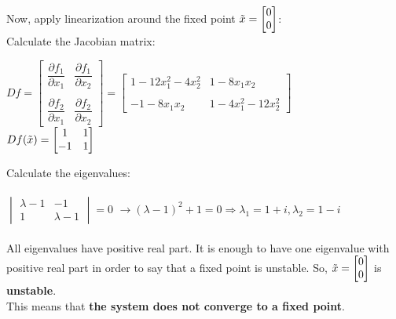 \documentclass[12pt,a4paper, margin=1in]{article}
\begin{document}
\begin{enumerate}
        Now, apply linearization around the fixed point $\Tilde{x} = \begin{bmatrix} 0 \\ 0\end{bmatrix}$: \\
        Calculate the Jacobian matrix:
        \begin{center}
            $Df = \begin{bmatrix}
                    \dfrac{\partial f_1}{\partial x_1} & \dfrac{\partial f_1}{\partial x_2} \\ \\
                    \dfrac{\partial f_2}{\partial x_1} & \dfrac{\partial f_2}{\partial x_2}
                \end{bmatrix} = \begin{bmatrix}
                    1 - 12x_1^2 -4x_2^2 & 1 -8x_1x_2 \\ \\
                    -1 - 8x_1x_2 & 1 - 4x_1^2 - 12x_2^2
                \end{bmatrix}$ \\
            $Df(\Tilde{x}) = \begin{bmatrix}
                1 & 1 \\
                -1 & 1
            \end{bmatrix}$
        \end{center}

        Calculate the eigenvalues: \\ \\
        $\begin{vmatrix}
            \lambda - 1 & -1 \\
            1 & \lambda -1
        \end{vmatrix} = 0$ $\longrightarrow (\lambda - 1)^2 + 1 = 0 \Longrightarrow \lambda_1 = 1 + i, \lambda_2 = 1 - i$
        \\\\
        All eigenvalues have positive real part. It is enough to have one eigenvalue with positive real part in order to say that a fixed point is unstable. So, $\Tilde{x} = \begin{bmatrix}
            0 \\0
        \end{bmatrix}$ is \textbf{unstable}. \\

        This means that \textbf{the system does not converge to a fixed point}.
        \\


\end{enumerate}
\end{document}
